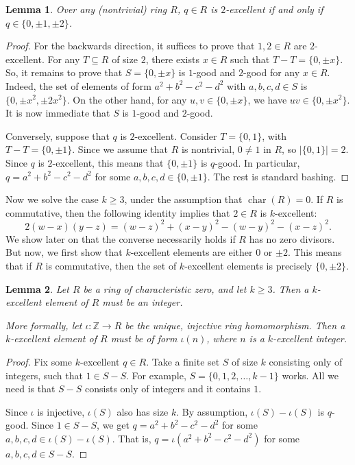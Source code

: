 \documentclass{article}
\newcommand{\Z}{\mathbb{Z}}
\DeclareMathOperator{\rchar}{char}
\newtheorem{lemma}{Lemma}
\begin{document}
\begin{lemma}\label{2017a2-1}
Over any (nontrivial) ring $R$, $q \in R$ is $2$-excellent if and only if $q \in \{0, \pm 1, \pm 2\}$.
\end{lemma}
\begin{proof}
For the backwards direction, it suffices to prove that $1, 2 \in R$ are $2$-excellent.
For any $T \subseteq R$ of size $2$, there exists $x \in R$ such that $T - T = \{0, \pm x\}$.
So, it remains to prove that $S = \{0, \pm x\}$ is $1$-good and $2$-good for any $x \in R$.
Indeed, the set of elements of form $a^2 + b^2 - c^2 - d^2$ with $a, b, c, d \in S$ is $\{0, \pm x^2, \pm 2x^2\}$.
On the other hand, for any $u, v \in \{0, \pm x\}$, we have $uv \in \{0, \pm x^2\}$.
It is now immediate that $S$ is $1$-good and $2$-good.

Conversely, suppose that $q$ is $2$-excellent.
Consider $T = \{0, 1\}$, with $T - T = \{0, \pm 1\}$.
Since we assume that $R$ is nontrivial, $0 \neq 1$ in $R$, so $|\{0, 1\}| = 2$.
Since $q$ is $2$-excellent, this means that $\{0, \pm 1\}$ is $q$-good.
In particular, $q = a^2 + b^2 - c^2 - d^2$ for some $a, b, c, d \in \{0, \pm 1\}$.
The rest is standard bashing.
\end{proof}

Now we solve the case $k \geq 3$, under the assumption that $\rchar(R) = 0$.
If $R$ is commutative, then the following identity implies that $2 \in R$ is $k$-excellent:
\[ 2(w - x)(y - z) = (w - z)^2 + (x - y)^2 - (w - y)^2 - (x - z)^2. \]
We show later on that the converse necessarily holds if $R$ has no zero divisors.
But now, we first show that $k$-excellent elements are either $0$ or $\pm 2$.
This means that if $R$ is commutative, then the set of $k$-excellent elements is precisely $\{0, \pm 2\}$.

\begin{lemma}\label{2017a2-2}
Let $R$ be a ring of characteristic zero, and let $k \geq 3$.
Then a $k$-excellent element of $R$ must be an integer.

More formally, let $\iota : \Z \to R$ be the unique, injective ring homomorphism.
Then a $k$-excellent element of $R$ must be of form $\iota(n)$, where $n$ is a $k$-excellent integer.
\end{lemma}
\begin{proof}
Fix some $k$-excellent $q \in R$.
Take a finite set $S$ of size $k$ consisting only of integers, such that $1 \in S - S$.
For example, $S = \{0, 1, 2, \ldots, k - 1\}$ works.
All we need is that $S - S$ consists only of integers and it contains $1$.

Since $\iota$ is injective, $\iota(S)$ also has size $k$.
By assumption, $\iota(S) - \iota(S)$ is $q$-good.
Since $1 \in S - S$, we get $q = a^2 + b^2 - c^2 - d^2$ for some $a, b, c, d \in \iota(S) - \iota(S)$.
That is, $q = \iota(a^2 + b^2 - c^2 - d^2)$ for some $a, b, c, d \in S - S$.
\end{proof}
\end{document}
